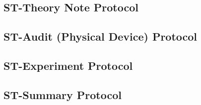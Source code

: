 \subsection{ST-Theory Note Protocol}
\subsection{ST-Audit (Physical Device) Protocol}
\subsection{ST-Experiment Protocol}
\subsection{ST-Summary Protocol}
